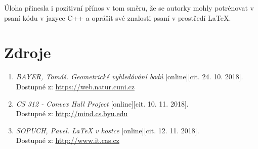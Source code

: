 \documentclass[a4paper, 12pt]{article}
\begin{document}
Úloha přinesla i pozitivní přínos v tom směru, že se autorky mohly potrénovat v psaní kódu v jazyce C++ a oprášit své znalosti psaní v prostředí LaTeX.

\clearpage

\section{Zdroje}
\begin{enumerate}
\item  \textsl{BAYER, Tomáš. Geometrické vyhledávání bodů} [online][cit. 24. 10. 2018].\\
Dostupné z: \href{https://web.natur.cuni.cz/~bayertom/images/courses/Adk/adk4.pdf}{https://web.natur.cuni.cz}

\item  \textsl{CS 312 - Convex Hull Project} [online][cit. 10. 11. 2018].\\
Dostupné z: \href{http://mind.cs.byu.edu/courses/312/projects/project2_files/ConvexHull_python.php}{http://mind.cs.byu.edu}

\item  \textsl{SOPUCH, Pavel. LaTeX v kostce} [online][cit. 12. 11. 2018].\\
Dostupné z: \href{http://www.it.cas.cz/manual/latex/}{http://www.it.cas.cz}


\end{enumerate}
\end{document}
